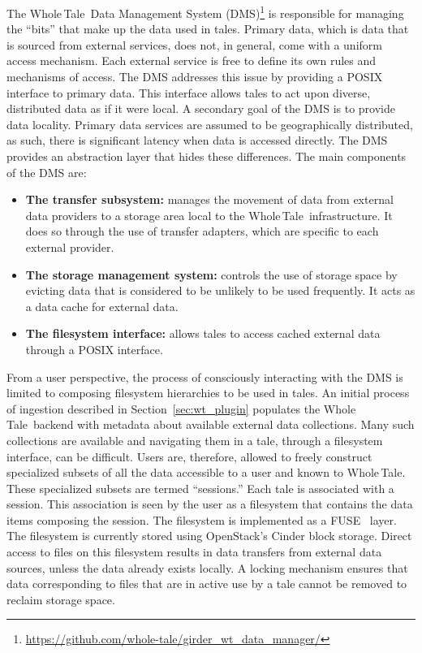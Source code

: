 \documentclass[review]{elsarticle}
\newcommand\mihael[1]{}
\newcommand\mihael[1]{{\color{olive}[Mihael: #1]}}
\newcommand{\wt}{Whole\,Tale}
\begin{document}
The \wt\ Data Management System (DMS)\footnote{\url{https://github.com/whole-tale/girder_wt_data_manager/}} is responsible for  managing the ``bits'' that make up the data used in tales. Primary data, which is data that is sourced from external services, does not, in general, come with a uniform access mechanism. Each external service is free to define its own rules and mechanisms of access. The DMS addresses this issue by providing a POSIX interface to primary data. 
This interface allows tales to act upon diverse, distributed data as if it were local.
A secondary goal of the DMS is to provide data locality. Primary data services are assumed to be geographically distributed, as such, there is significant latency when data is accessed directly. The DMS provides an abstraction layer that hides these differences. The main components of the DMS are:

\begin{itemize}
	\item \textbf{The transfer subsystem:}
		manages the movement of data from external data providers to a storage area local to the \wt\ infrastructure. It does so through the use of transfer adapters, which are specific to each external provider.

	\item \textbf{The storage management system:} controls the use of storage space by evicting data that is considered to be unlikely to be used frequently. It acts as a data cache for external data.
	
	\item \textbf{The filesystem interface:} allows tales to access cached external data through a POSIX interface. 
\end{itemize}

From a user perspective, the process of consciously interacting with the DMS is limited to composing filesystem hierarchies to be used in tales. An initial process of ingestion described in Section~\ref{sec:wt_plugin} populates the \wt\ backend with metadata about available external data collections. Many such collections are available and navigating them in a tale, through a filesystem interface, can be difficult. Users are, therefore, allowed to freely construct specialized subsets of all the data accessible to a user and known to \wt.
These specialized subsets are termed ``sessions.'' Each tale is associated with a session. This association is seen by the user as a filesystem that contains the data items composing the session. The filesystem is implemented as a FUSE~\cite{fuse} layer. The filesystem is currently stored using OpenStack's Cinder block storage. 
Direct access to files on this filesystem results in data transfers from external data sources, unless the data already exists locally. A locking mechanism ensures that data corresponding to files that are in active use by a tale cannot be removed to reclaim storage space.
\end{document}

